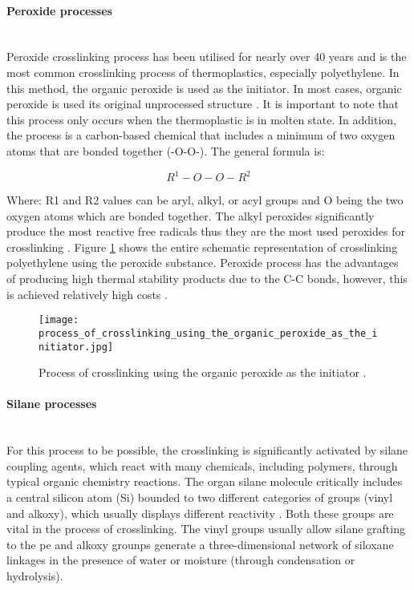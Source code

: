 \paragraph{Peroxide processes} \hfill \\
 Peroxide crosslinking process has been utilised for nearly over 40 years and is the most common crosslinking process of thermoplastics, especially polyethylene. In this method, the organic peroxide is used as the initiator. In most cases, organic peroxide is used its original unprocessed structure \cite{meola2005cross}. It is important to note that this process only occurs when the thermoplastic is in molten state. In addition, the process is a carbon-based chemical that includes a minimum of two oxygen atoms that are bonded together (-O-O-). The general formula is:  

 \begin{equation}
    R^1-O-O-R^2
 \end{equation}

Where: R1 and R2 values can be aryl, alkyl, or acyl groups and O being the two oxygen atoms which are bonded together. The alkyl peroxides significantly produce the most reactive free radicals thus they are the most used peroxides for crosslinking \cite{kurtz2009cross}. Figure \ref{ch3:figure:crosslinking_process} shows the entire schematic representation of crosslinking polyethylene using the peroxide substance. Peroxide process has the advantages of producing high thermal stability products due to the C-C bonds, however, this is achieved relatively high costs \cite{patterson2022cross}.

\begin{figure}[H]
    \centering
    \texttt{[image: process\_of\_crosslinking\_using\_the\_organic\_peroxide\_as\_the\_initiator.jpg]}
    \caption{Process of crosslinking using the organic peroxide as the initiator \cite{meola2005cross}. }
    \label{ch3:figure:crosslinking_process}
\end{figure}

\paragraph{Silane processes} \hfill \\
For this process to be possible, the crosslinking is significantly activated by silane coupling agents, which react with many chemicals, including polymers, through typical organic chemistry reactions. The organ silane molecule critically includes a central silicon atom (Si) bounded to two different categories of groups (vinyl and alkoxy), which usually displays different reactivity \cite{kurtz2009cross}. Both these groups are vital in the process of crosslinking. The vinyl groups usually allow silane grafting to the \acrshort{pe} and alkoxy grounps generate a three-dimensional network of siloxane linkages in the presence of water or moisture (through condensation or hydrolysis).

